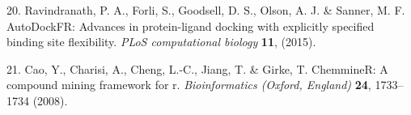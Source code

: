 \documentclass[
]{article}
\newenvironment{cslreferences}%
  {}%
  {\par}
\begin{document}
\begin{cslreferences}
\leavevmode\hypertarget{ref-AutodockfrAdvRavind2015}{}%
20. Ravindranath, P. A., Forli, S., Goodsell, D. S., Olson, A. J. \& Sanner, M. F. AutoDockFR: Advances in protein-ligand docking with explicitly specified binding site flexibility. \emph{PLoS computational biology} \textbf{11}, (2015).

\leavevmode\hypertarget{ref-ChemminerACoCaoY2008}{}%
21. Cao, Y., Charisi, A., Cheng, L.-C., Jiang, T. \& Girke, T. ChemmineR: A compound mining framework for r. \emph{Bioinformatics (Oxford, England)} \textbf{24}, 1733--1734 (2008).
\end{cslreferences}
\end{document}
